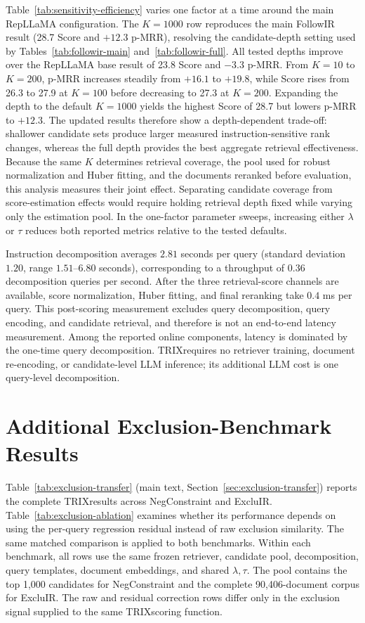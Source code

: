 \documentclass[letterpaper]{article}
\newcommand{\method}{\ifmmode \mathrm{TRIX}\else TRIX\xspace\fi}
\begin{document}
Table~\ref{tab:sensitivity-efficiency} varies one factor at a time around the
main RepLLaMA configuration.  The $K=1000$ row reproduces the main FollowIR
result (28.7 Score and $+12.3$ p-MRR), resolving the candidate-depth setting
used by Tables~\ref{tab:followir-main} and~\ref{tab:followir-full}.  All tested
depths improve over the RepLLaMA base result of 23.8 Score and $-3.3$ p-MRR.
From $K=10$ to $K=200$, p-MRR increases steadily from $+16.1$ to $+19.8$,
while Score rises from 26.3 to 27.9 at $K=100$ before decreasing to 27.3 at
$K=200$.  Expanding the depth to the default $K=1000$ yields the highest Score
of 28.7 but lowers p-MRR to $+12.3$.  The updated results therefore show a
depth-dependent trade-off: shallower candidate sets produce larger measured
instruction-sensitive rank changes, whereas the full depth provides the best
aggregate retrieval effectiveness.  Because the same $K$ determines retrieval
coverage, the pool used for robust normalization and Huber fitting, and the
documents reranked before evaluation, this analysis measures their joint
effect.  Separating candidate coverage from score-estimation effects would
require holding retrieval depth fixed while varying only the estimation pool.
In the one-factor parameter sweeps, increasing either $\lambda$ or $\tau$
reduces both reported metrics relative to the tested defaults.

Instruction decomposition averages $2.81$ seconds per query (standard
deviation $1.20$, range $1.51$--$6.80$ seconds), corresponding to a throughput
of $0.36$ decomposition queries per second.  After the three retrieval-score
channels are available, score normalization, Huber fitting, and final
reranking take $0.4$ ms per query.  This post-scoring measurement excludes
query decomposition, query encoding, and candidate retrieval, and therefore is
not an end-to-end latency measurement.  Among the reported online components,
latency is dominated by the one-time query decomposition.  \method requires no
retriever training, document re-encoding, or candidate-level LLM inference;
its additional LLM cost is one query-level decomposition.

\section{Additional Exclusion-Benchmark Results}
\label{app:exclusion-benchmarks}

Table~\ref{tab:exclusion-transfer} (main text,
Section~\ref{sec:exclusion-transfer}) reports the complete \method results
across NegConstraint and ExcluIR.  Table~\ref{tab:exclusion-ablation} examines
whether its performance depends on using the per-query regression residual
instead of raw exclusion similarity.  The same matched comparison is applied
to both benchmarks.  Within each benchmark, all rows use the same frozen
retriever, candidate pool, decomposition, query templates, document embeddings,
and shared $\lambda,\tau$.  The pool contains the top 1,000 candidates for
NegConstraint and the complete 90,406-document corpus for ExcluIR.  The raw
and residual correction rows differ only in the exclusion signal supplied to
the same \method scoring function.
\end{document}
